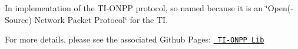 In implementation of the TI-\/\+ONPP protocol, so named because it is an \char`\"{}\+Open(-\/\+Source) Network Packet Protocol\char`\"{} for the TI.

For more details, please see the associated Github Pages\+: \href{https://acagliano.github.io/packetlib/html/}{\texttt{ TI-\/\+ONPP Lib}} 
